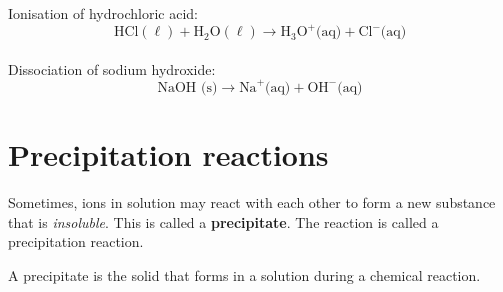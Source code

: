 Ionisation of hydrochloric acid:\\
        \label{m38720*id339770}\nopagebreak\noindent          
    \begin{equation*}
    \text{HCl} (\ell)  +{\text{H}}_{2}\text{O} (\ell) \to {\text{H}}_{3}{\text{O}}^{+} \text{(aq)} +{\text{Cl}}^{-} \text{(aq)}
      \end{equation*}\\
        \label{m38720*id339831}\nopagebreak\noindent
Dissociation of sodium hydroxide:\\          
    \begin{equation*}
    \text{NaOH (s)} \to {\text{Na}}^{+} \text{(aq)} + {\text{OH}}^{-} \text{(aq)}
      \end{equation*}
 \par 
\label{m38720**end}
            \section{Precipitation reactions}
            \nopagebreak
      \label{m38719*id339907}Sometimes, ions in solution may react with each other to form a new substance that is \textsl{insoluble}. This is called a \textbf{precipitate}. The reaction is called a precipitation reaction. \par 
{}
\label{m38719*fhsst!!!underscore!!!id887}
 {   A precipitate is the solid that forms in a solution during a chemical reaction.} 
\label{m38719*secfhsst!!!underscore!!!id890}

